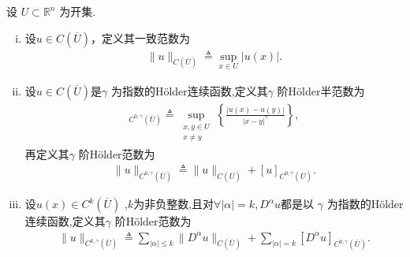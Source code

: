 \documentclass[../../main.tex]{subfiles}
\begin{document}
\begin{definition}\label{definition:ch05-holder范数}
设 $U\subset\mathbb{R}^{n}$ 为开集.
\begin{enumerate}[(i)]
\item 设$u\in C(\overline{U})$，定义其一致范数为
\begin{align*}
\|u\|_{C(\overline{U})}\triangleq \sup_{x\in U}|u(x)|.
\end{align*}

\item 设$u\in C(\overline{U})$是$\gamma$ 为指数的H\"older连续函数,定义其$\gamma$ 阶H\"older半范数为
\begin{align*}
[u]_{C^{0,\gamma}(\overline{U})}\triangleq \sup_{\substack{x,y\in U\\ x\neq y}}\left\{\frac{|u(x)-u(y)|}{|x-y|^{\gamma}}\right\},
\end{align*}
再定义其$\gamma$ 阶H\"older范数为
\begin{align*}
\|u\|_{C^{0,\gamma}(\overline{U})}\triangleq \|u\|_{C(\overline{U})}+[u]_{C^{0,\gamma}(\overline{U})}.
\end{align*}

\item 设$u\left( x \right) \in C^k\left( \overline{U} \right)$ ,$k$为非负整数,且对$\forall \left| \alpha \right|=k,D^{\alpha}u$都是以 $\gamma$ 为指数的H\"older连续函数,定义其$\gamma$ 阶H\"older范数为
\begin{align*}
\|u\|_{C^{k,\gamma}(\overline{U})}\triangleq \sum_{|\alpha|\leqslant k}\|D^{\alpha}u\|_{C(\overline{U})}+\sum_{|\alpha|=k}[D^{\alpha}u]_{C^{0,\gamma}(\overline{U})}.
\end{align*}
\end{enumerate}
\end{definition}
\end{document}
